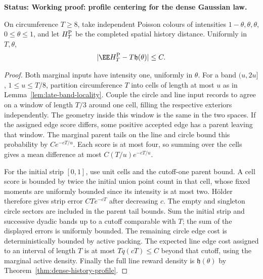 \documentclass[11pt,letterpaper]{article}
\newcommand{\status}[1]{\textbf{Status: #1.}}
\begin{document}
\status{Working proof: profile centering for the dense Gaussian law}

\begin{lemma}
\label{lem:Poisson-circle-profile-mean}
On circumference $T\ge8$, take independent Poisson colours
of intensities $1-\theta,\theta,\theta$, $0\le\theta\le1$,
and let $H_T^{\rm P}$ be the completed spatial history distance.
Uniformly in $T,\theta$,
\begin{equation}\label{eq:Poisson-circle-profile-mean}
 |\EE H_T^{\rm P}-T\mathfrak h(\theta)|\le C.
\end{equation}
\end{lemma}
\begin{proof}
Both marginal inputs have intensity one, uniformly in $\theta$.
For a band $(u,2u]$, $1\le u\le T/8$, partition circumference
$T$ into cells of length at most $u$ as in
Lemma~\ref{lem:late-band-locality}.
Couple the circle and line input records to agree on a
window of length $T/3$ around one cell, filling the respective
exteriors independently. The geometry inside this window is
the same in the two spaces.
If the assigned edge score differs, some positive accepted
edge has a parent leaving that window.
The marginal parent tails on the line and circle bound this
probability by $Ce^{-cT/u}$.
Each score is at most four, so summing over the cells gives
a mean difference at most $C(T/u)e^{-cT/u}$.

For the initial strip $[0,1]$, use unit cells and the
cutoff-one parent bound. A cell score is bounded by twice
the initial union point count in that cell, whose fixed
moments are uniformly bounded since its intensity is at
most two. H\"older therefore gives strip error $CTe^{-cT}$
after decreasing $c$.
The empty and singleton circle sectors are included in the
parent tail bounds.
Sum the initial strip and successive dyadic bands up to a
cutoff comparable with $T$; the sum of the displayed errors
is uniformly bounded. The remaining circle edge cost is
deterministically bounded by active packing. The expected
line edge cost assigned to an interval of length $T$ is
at most $Tq(cT)\le C$ beyond that cutoff, using the marginal
active density. Finally the full line reward density is
$\mathfrak h(\theta)$ by Theorem~\ref{thm:dense-history-profile}.
\end{proof}
\end{document}
